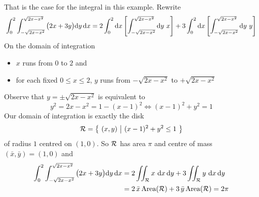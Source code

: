 \begin{eg}
That is the case for the integral in this example. Rewrite
\begin{equation*}
\int_0^2\int_{-\sqrt{2x-x^2}}^{\sqrt{2x-x^2}}
                                 \big(2x+3y\big)\dee{y}\,\dee{x}
=2\int_0^2\dee{x}\left[\int_{-\sqrt{2x-x^2}}^{\sqrt{2x-x^2}}\dee{y}\ x\right]
 +3\int_0^2\dee{x}\left[\int_{-\sqrt{2x-x^2}}^{\sqrt{2x-x^2}}\dee{y}\ y\right]
\end{equation*}
On the domain of integration
\begin{itemize}
\item
$x$ runs from $0$ to $2$ and
\item 
for each fixed $0\le x\le 2$, $y$ runs from $-\sqrt{2x-x^2}$ to 
$+\sqrt{2x-x^2}$
\end{itemize}
Observe that $y=\pm \sqrt{2x-x^2}$ is equivalent to
\begin{equation*}
y^2 = 2x-x^2 = 1-(x-1)^2 \iff
(x-1)^2 + y^2 =1
\end{equation*}
Our domain of integration is exactly the disk
\begin{equation*}
\mathcal{R} = \big\{ \ (x,y)\ \big|\ (x-1)^2 + y^2 \le 1\ \big\} 
\end{equation*}
of radius $1$ centred on $(1,0)$.
So $\mathcal{R}$ has area $\pi$ and centre of mass $(\bar x,\bar y)=(1,0)$ and
\begin{align*}
\int_0^2\int_{-\sqrt{2x-x^2}}^{\sqrt{2x-x^2}}
                                 \big(2x+3y\big)\mathrm{d}y\,\mathrm{d}x
&=2\iint_{\mathcal{R}} x\ \mathrm{d}x\,\mathrm{d}y
 +3\iint_{\mathcal{R}} y\ \mathrm{d}x\,\mathrm{d}y \\
&=2\,\bar x\, \text{Area}(\mathcal{R}) +3\,\bar y\, \text{Area}(\mathcal{R})
=2\pi
\end{align*}
\end{eg}


